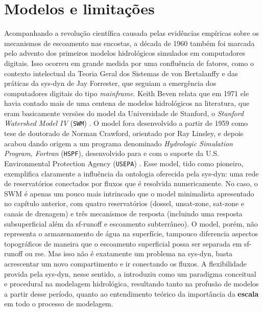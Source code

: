 \documentclass[./main.tex]{subfiles}
\begin{document}
\section{Modelos e limitações} \label{sec:hydro:others}

\par Acompanhando a revolução científica causada pelas evidências empíricas sobre os mecanismos de escoamento nas encostas, a década de 1960 também foi marcada pelo advento dos primeiros modelos hidrológicos simulados em computadores digitais. Isso ocorreu em grande medida por uma confluência de fatores, como o contexto intelectual da Teoria Geral dos Sistemas de von Bertalanffy e das práticas da \gls{sys-dyn} de Jay Forrester, que seguiam a emergência dos computadores digitais do tipo \textit{mainframe}. Keith Beven relata que em 1971 ele havia contado mais de uma centena de modelos hidrológicos na literatura, que eram basicamente versões do \gls{model} da Universidade de Stanford, o \textit{Stanford Watershed Model IV} (\texttt{SWM}) \cite{Beven2019a}. O \gls{model} fora desenvolvido a partir de 1959 como tese de doutorado de Norman Crawford, orientado por Ray Linsley, e depois acabou dando origem a um programa denominado \textit{Hydrologic Simulation Program, Fortran} (\texttt{HSPF}), desenvolvido para e com o suporte da U.S. Environmental Protection Agency (\texttt{USEPA}) \cite{Burges2004a}. Esse \gls{model}, tido como pioneiro, exemplifica claramente a influência da ontologia oferecida pela \gls{sys-dyn}: uma rede de reservatórios conectados por fluxos que é resolvida numericamente. No caso, o SWM é apenas um pouco mais intrincado que o \gls{model} minimalista apresentado no capítulo anterior, com quatro reservatórios (dossel, \gls{unsat-zone}, \gls{sat-zone} e canais de drenagem) e três mecanismos de resposta (incluindo uma resposta subsuperficial além da \gls{sf-runoff} e escoamento subterrâneo). O \gls{model}, porém, não representa o armazenamento de água na superfície, tampouco diferencia aspectos topográficos de maneira que o escoamento superficial possa ser separada em \gls{sf-runoff} ou \gls{rse}. Mas isso não é exatamente um problema na \gls{sys-dyn}, basta acrescentar um novo compartimento e ir conectando os fluxos. A flexibilidade provida pela \gls{sys-dyn}, nesse sentido, a introduziu como um \gls{paradigma} conceitual e procedural na modelagem hidrológica, resultando tanto na profusão de modelos a partir desse período, quanto ao entendimento teórico da importância da \textbf{escala} em todo o processo de modelagem.
\end{document}
